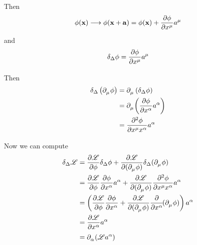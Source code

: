 \documentclass{article}
\begin{document}
\noindent Then
\begin{equation*}
    \phi (\mathbf{x}) \longrightarrow \phi ( \mathbf{x} + \mathbf{a} ) = \phi (\mathbf{x}) + \dfrac{ \partial \phi }{ \partial \tensor{x}{^\mu} } \tensor{a}{^\mu}
\end{equation*}
and
\begin{equation*}
    \delta_\Delta \phi = \dfrac{ \partial \phi }{ \partial \tensor{x}{^\mu} } \tensor{a}{^\mu}
\end{equation*}

\noindent Then
\begin{align*}
    \delta_\Delta \left( \tensor{\partial}{_\mu} \phi \right) &= \tensor{\partial}{_\mu} \left( \delta_\Delta \phi \right) \\
    &= \tensor{\partial}{_\mu} \! \left( \dfrac{ \partial \phi }{ \partial \tensor{x}{^\alpha} } \tensor{a}{^\alpha} \right) \\
    &= \dfrac{ \partial^2 \phi }{ \partial \tensor{x}{^\mu} \tensor{x}{^\alpha} } \tensor{a}{^\alpha}
\end{align*}

\noindent Now we can compute
\begin{align*}
    \delta_\Delta \mathscr{L} &= \dfrac{ \partial \mathscr{L} }{ \partial \phi } \delta_\Delta \phi + \dfrac{ \partial \mathscr{L} }{ \partial ( \tensor{\partial}{_\mu} \phi ) } \delta_\Delta ( \tensor{\partial}{_\mu} \phi ) \\
    &= \dfrac{ \partial \mathscr{L} }{ \partial \phi } \dfrac{ \partial \phi }{ \partial \tensor{x}{^\alpha} } \tensor{a}{^\alpha} + \dfrac{ \partial \mathscr{L} }{ \partial ( \tensor{\partial}{_\mu} \phi ) } \dfrac{ \partial^2 \phi }{ \partial \tensor{x}{^\mu} \tensor{x}{^\alpha} } \tensor{a}{^\alpha} \\
    &= \left( \dfrac{ \partial \mathscr{L} }{ \partial \phi } \dfrac{ \partial \phi }{ \partial \tensor{x}{^\alpha} } + \dfrac{ \partial \mathscr{L} }{ \partial ( \tensor{\partial}{_\mu} \phi ) } \dfrac{\partial}{ \partial \tensor{x}{^\alpha} } \! ( \tensor{\partial}{_\mu} \phi ) \right) \tensor{a}{^\alpha} \\
    &= \dfrac{ \partial \mathscr{L} }{ \partial \tensor{x}{^\alpha} } \tensor{a}{^\alpha} \\
    &= \tensor{\partial}{_\alpha} ( \mathscr{L} \tensor{a}{^\alpha} )
\end{align*}

\end{document}
